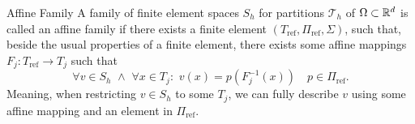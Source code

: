 \begin{defn}{Affine Family}
    A family of finite element spaces $S_h$ for partitions $\mathcal{T}_h$ of 
    $\Omega\subset \mathbb{R}^d$ is called an affine family if there exists a finite 
    element $(T_{\text{ref}}, \Pi_{\text{ref}},\Sigma)$, such that, beside the 
    usual properties of a finite element, there exists some affine mappings 
    $F_j:T_{\text{ref}}\to T_j$ such that
    \begin{equation*}
        \forall v \in S_h \,\,\land \,\, \forall x \in T_j:\,\, v(x) = p(F^{-1}_j(x)) \quad 
        p \in \Pi_{\text{ref}}.
    \end{equation*}
    Meaning, when restricting $v\in S_h$ to some $T_j$, we can fully describe 
    $v$ using some affine mapping and an element in $\Pi_{\text{ref}}$.
\end{defn}